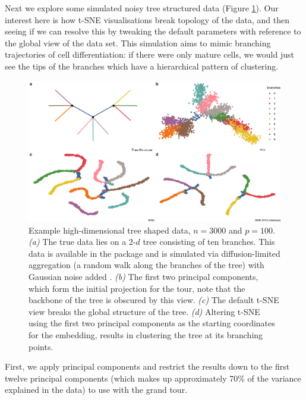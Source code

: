 \documentclass[article,notitle]{jdssv}
\begin{document}
Next we explore some simulated noisy tree structured data (Figure
\ref{fig:fake-trees}). Our interest here is how t-SNE visualisations break
topology of the data, and then seeing if we can resolve this by tweaking the
default parameters with reference to the global view of the data set.
This simulation aims to mimic branching trajectories of cell differentiation:
if there were only mature cells, we would just see the tips of the branches
which have a hierarchical pattern of clustering.



\begin{figure}

{\centering \includegraphics[width=\textwidth]{./img/tree-view} 

}

\caption{Example high-dimensional tree shaped data, \(n = 3000\) and \(p = 100\). \emph{(a)} The true data lies on a 2-\(d\) tree consisting of ten branches. This data is available in the  package and is simulated via diffusion-limited aggregation (a random walk along the branches of the tree) with Gaussian noise added \citep{Moon2019-ce}. \emph{(b)} The first two principal components, which form the initial projection for the tour, note that the backbone of the tree is obscured by this view. \emph{(c)} The default t-SNE view breaks the global structure of the tree. \emph{(d)} Altering t-SNE using the first two principal components as the starting coordinates for the embedding, results in clustering the tree at its branching points.}\label{fig:fake-trees}
\end{figure}

First, we apply principal components and restrict the results down to the first
twelve principal components (which makes up approximately 70\% of the variance
explained in the data) to use with the grand tour.
\end{document}
